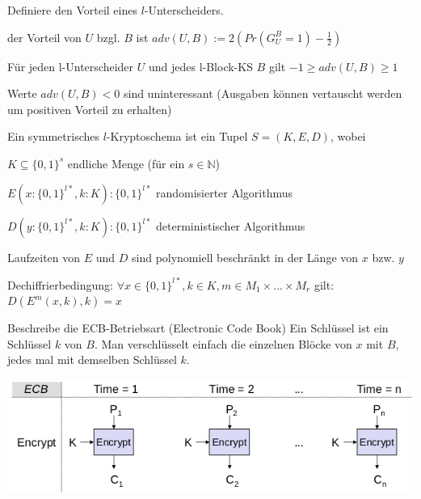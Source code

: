 \documentclass[avery5371, frame]{flashcards}
\begin{document}
\begin{flashcard}{Definiere den Vorteil eines $l$-Unterscheiders.}
    \begin{itemize*}
        \item der Vorteil von $U$ bzgl. $B$ ist $adv(U,B):= 2(Pr(G^B_U=1)-\frac{1}{2})$
        \item Für jeden l-Unterscheider $U$ und jedes l-Block-KS $B$ gilt $-1\geq adv(U,B)\geq 1$
        \item Werte $adv(U,B)<0$ sind uninteressant (Ausgaben können vertauscht werden um positiven Vorteil zu erhalten)
    \end{itemize*}
\end{flashcard}

\begin{flashcard}{Ein symmetrisches $l$-Kryptoschema ist ein Tupel $S= (K,E,D)$, wobei}
    \begin{itemize*}
        \item $K\subseteq\{0,1\}^s$ endliche Menge (für ein $s\in\mathbb{N}$)
        \item $E(x:\{0,1\}^{l*},k:K) :\{0,1\}^{l*}$ randomisierter Algorithmus
        \item $D(y:\{0,1\}^{l*},k:K) :\{0,1\}^{l*}$ deterministischer Algorithmus
        \item Laufzeiten von $E$ und $D$ sind polynomiell beschränkt in der Länge von $x$ bzw. $y$
        \item Dechiffrierbedingung: $\forall x\in\{0,1\}^{l*},k\in K,m\in M_1\times...\times M_r$ gilt: $D(E^m(x,k),k)=x$
    \end{itemize*}
\end{flashcard}

\begin{flashcard}[Betriebsarten]{Beschreibe die ECB-Betriebsart (Electronic Code Book)}
    Ein Schlüssel ist ein Schlüssel $k$ von $B$. Man verschlüsselt einfach die einzelnen Blöcke von $x$ mit $B$, jedes mal mit demselben Schlüssel $k$.

    \includegraphics[width=.9\linewidth]{Assets/NetworkSecurity-electronic-code-book-mode.png}
\end{flashcard}
\end{document}
